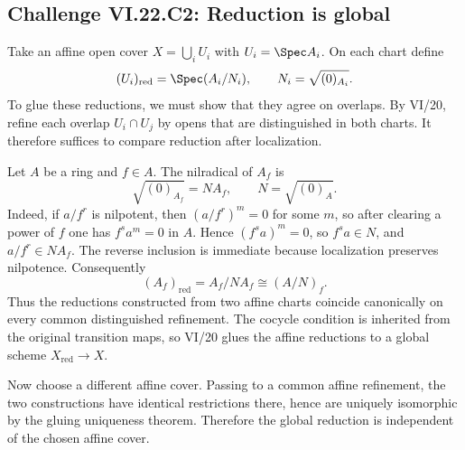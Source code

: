 \subsection*{Challenge VI.22.C2: Reduction is global}
\begin{solution}
Take an affine open cover $X=\bigcup_i U_i$ with $U_i=\Spec A_i$.  On each chart define
\[
 (U_i)_{\mathrm{red}}
 =\Spec(A_i/N_i),
 \qquad
 N_i=\sqrt{(0)_{A_i}}.
\]
To glue these reductions, we must show that they agree on overlaps.  By VI/20, refine each
overlap $U_i\cap U_j$ by opens that are distinguished in both charts.  It therefore suffices
to compare reduction after localization.

Let $A$ be a ring and $f\in A$.  The nilradical of $A_f$ is
\[
 \sqrt{(0)_{A_f}}=N A_f,
 \qquad N=\sqrt{(0)_A}.
\]
Indeed, if $a/f^r$ is nilpotent, then $(a/f^r)^m=0$ for some $m$, so after clearing a power of
$f$ one has $f^s a^m=0$ in $A$.  Hence $(f^s a)^m=0$, so $f^s a\in N$, and
$a/f^r\in NA_f$.  The reverse inclusion is immediate because localization preserves
nilpotence.  Consequently
\[
 (A_f)_{\mathrm{red}}
 =A_f/NA_f
 \cong (A/N)_f.
\]
Thus the reductions constructed from two affine charts coincide canonically on every common
distinguished refinement.  The cocycle condition is inherited from the original transition
maps, so VI/20 glues the affine reductions to a global scheme $X_{\mathrm{red}}\to X$.

Now choose a different affine cover.  Passing to a common affine refinement, the two
constructions have identical restrictions there, hence are uniquely isomorphic by the gluing
uniqueness theorem.  Therefore the global reduction is independent of the chosen affine cover.
\end{solution}


